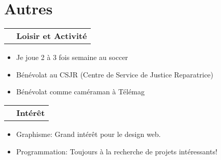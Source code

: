 \documentclass[a4paper,11pt]{extarticle}
\makeatletter
\newlength{\indicewidth}%
\newlength{\separatorcolumnwidth}%
\newlength{\maincolumnwidth}%
\newcommand{\indicestyle}[1]{\slshape\textcolor{color0}{#1}}
\def\middleline{
\raisebox{0.35em}{\line(1,0){50}}
}
\renewcommand{\subsection}[1]{
\par\addvspace{3ex}
\begin{tabular}{@{}p{\indicewidth}@{\hspace{\separatorcolumnwidth}}p{\maincolumnwidth}@{}}%
    \raggedleft\indicestyle{}\middleline & { \strut\bfseries {#1} }%
    \par
\end{tabular}%
\vspace{-0.5em}
}
\makeatother
\begin{document}
\section{Autres}
\subsection{Loisir et Activité}
\begin{itemize}

\item Je joue 2 à 3 fois semaine au soccer
\item Bénévolat au CSJR (Centre de Service de Justice Reparatrice)
\item Bénévolat comme caméraman à Télémag
\end{itemize}
\subsection{Intérêt}
\begin{itemize}
\item Graphisme: Grand intérêt pour le design web.
\item Programmation: Toujours à la recherche de projets intéressants!
\end{itemize}
\end{document}
